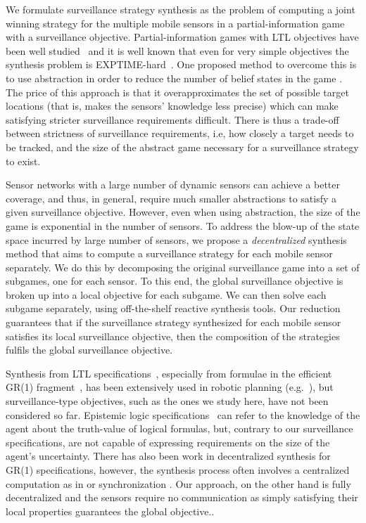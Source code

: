 We formulate surveillance strategy synthesis as the problem of computing a joint winning strategy for the multiple mobile sensors in a partial-information game with a surveillance objective. Partial-information games with LTL objectives have been well studied~\cite{DoyenR11,Chatterjee2013} and it is well known that even for very simple objectives the synthesis problem is EXPTIME-hard~\cite{Reif84,BerwangerD08}. One proposed method to overcome this is to use abstraction in order to reduce the number of belief states in the game \cite{Bhar17}. The price of this approach is that it overapproximates the set of possible target locations (that is, makes the sensors' knowledge less precise) which can make satisfying stricter surveillance requirements difficult. There is thus a trade-off between strictness of surveillance requirements, i.e, how closely a target needs to be tracked, and the size of the abstract game necessary for a surveillance strategy to exist. 

Sensor networks with a large number of dynamic sensors can achieve a better coverage, and thus, in general, require much smaller abstractions to satisfy a given surveillance objective. However, even when using abstraction, the size of the game is exponential in the number of sensors. To address the blow-up of the state space incurred by large number of sensors, we propose a \emph{decentralized} synthesis method that aims to compute a surveillance strategy for each mobile sensor separately. We do this by decomposing the original surveillance game into a set of subgames, one for each sensor. To this end, the global surveillance objective is  broken up into a local objective for each subgame. We can then solve each subgame separately, using off-the-shelf reactive synthesis tools. Our reduction guarantees  that if the surveillance strategy synthesized for each mobile sensor satisfies its local surveillance objective, then the composition of the strategies fulfils the global surveillance objective.

Synthesis from LTL specifications~\cite{Pnueli1989}, especially from formulae in the efficient GR(1) fragment~\cite{Piterman2006}, has been extensively used in robotic planning (e.g.~\cite{wong2012,Kress2007}), but surveillance-type objectives, such as the ones we study here, have not been considered so far. Epistemic logic specifications~\cite{MeydenV98} can refer to the knowledge of the agent about the truth-value of logical formulas, but, contrary to our surveillance specifications, are not capable of expressing requirements on the size of the agent's uncertainty. There has also been work in decentralized synthesis for GR(1) specifications, however, the synthesis process often involves a centralized computation as in \cite{Kloetzer06} or synchronization \cite{Salar17,Kloetzer11}. Our approach, on the other hand is fully  decentralized and the sensors require no communication as simply satisfying their local properties guarantees the global objective.. 

